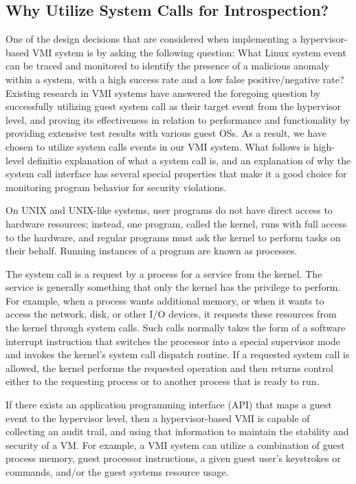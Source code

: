 \documentclass{report}
\begin{document}
\begin{spacing}{1.5}
\subsection{Why Utilize System Calls for Introspection?}
{\large
One of the design decisions that are considered when implementing a hypervisor-based VMI system is by asking the following question: What Linux system event can be traced and monitored to identify the presence of a malicious anomaly within a system, with a high success rate and a low false positive/negative rate? Existing research in VMI systems have answered the foregoing question by successfully utilizing guest system call as their target event from the hypervisor level, and proving its effectiveness in relation to performance and functionality by providing extensive test results with various guest OSs. As a result, we have chosen to utilize system calls events in our VMI system. What follows is high-level definitio explanation of what a system call is, and an explanation of why the system call interface has several special properties that make it a good choice for monitoring program behavior for security violations.
\newline
}


{\large
On UNIX and UNIX-like systems, user programs do not have direct access to hardware resources; instead, one program, called the kernel, runs with full access to the hardware, and regular programs must ask the kernel to perform tasks on their behalf. Running instances of a program are known as processes.

The system call is a request by a process for a service from the kernel. The service is generally something that only the kernel has the privilege to perform. For example, when a process wants additional memory, or when it wants to access the network,
disk, or other I/O devices, it requests these resources from the kernel through system calls. Such calls normally takes the form of a software interrupt instruction that switches the processor into a special supervisor mode and invokes the kernel’s system call dispatch routine. If a requested system call is allowed, the kernel performs the requested operation and then returns control either to the requesting process or to
another process that is ready to run.
\newline
}

{\large
If there exists an application programming interface (API) that maps a guest event to the hypervisor level, then a hypervisor-based VMI is capable of collecting an audit trail, and using that information to maintain the stability and security of a VM. For example, a VMI system can utilize a combination of guest process memory, guest processor instructions, a given guest user’s keystrokes or commands, and/or the guest systems resource usage. 



}
\end{spacing}
\end{document}
